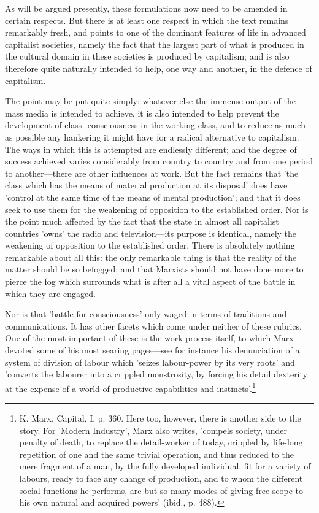 As will be argued presently, these formulations now need to be amended in certain respects. But there is at least one respect in which the text remains remarkably fresh, and points to one of the dominant features of life in advanced capitalist societies, namely the fact that the largest part of what is produced in the cultural domain in these societies is produced by capitalism; and is also therefore quite naturally intended to help, one way and another, in the defence of capitalism.

The point may be put quite simply: whatever else the immense output of the mass media is intended to achieve, it is also intended to help prevent the development of class- consciousness in the working class, and to reduce as much as possible any hankering it might have for a radical alternative to capitalism. The ways in which this is attempted are endlessly different; and the degree of success achieved varies considerably from country to country and from one period to another—there are other influences at work. But the fact remains that 'the class which has the means of material production at its disposal' does have 'control at the same time of the means of mental production'; and that it does seek to use them for the weakening of opposition to the established order. Nor is the point much affected by the fact that the state in almost all capitalist countries 'owns' the radio and television—its purpose is identical, namely the weakening of opposition to the established order. There is absolutely nothing remarkable about all this: the only remarkable thing is that the reality of the matter should be so befogged; and that Marxists should not have done more to pierce the fog which surrounds what is after all a vital aspect of the battle in which they are engaged.

Nor is that 'battle for consciousness' only waged in terms of traditions and communications. It has other facets which come under neither of these rubrics. One of the most important of these is the work process itself, to which Marx devoted some of his most searing pages—see for instance his denunciation of a system of division of labour which 'seizes labour-power by its very roots' and 'converts the labourer into a crippled monstrosity, by forcing his detail dexterity at the expense of a world of productive capabilities and instincts'.\footnote{K. Marx, Capital, I, p. 360. Here too, however, there is another side to the story. For 'Modern Industry', Marx also writes, 'compels society, under penalty of death, to replace the detail\hyp{}worker of today, crippled by life-long repetition of one and the same trivial operation, and thus reduced to the mere fragment of a man, by the fully developed individual, fit for a variety of labours, ready to face any change of production, and to whom the different social functions he performs, are but so many modes of giving free scope to his own natural and acquired powers' (ibid., p. 488).}

